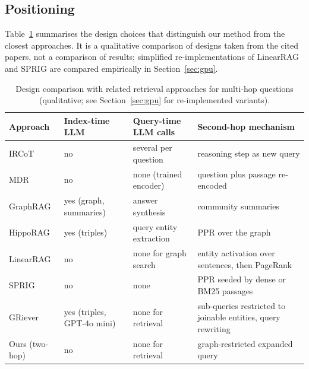 \documentclass[a4paper,fleqn]{cas-sc}
\begin{document}
\subsection{Positioning}
Table~\ref{tab:position} summarises the design choices that distinguish our method from the closest approaches. It is a qualitative comparison of designs taken from the cited papers, not a comparison of results; simplified re-implementations of LinearRAG and SPRIG are compared empirically in Section~\ref{sec:gpu}.

\begin{table}[t]
\centering
\small
\caption{Design comparison with related retrieval approaches for multi-hop questions (qualitative; see Section~\ref{sec:gpu} for re-implemented variants).}
\label{tab:position}
\begin{tabular}{p{3.6cm}p{2.7cm}p{3.0cm}p{3.6cm}}
\toprule
Approach & Index-time LLM & Query-time LLM calls & Second-hop mechanism \\
\midrule
IRCoT \citep{trivedi2023ircot} & no & several per question & reasoning step as new query \\
MDR \citep{xiong2021mdr} & no & none (trained encoder) & question plus passage re-encoded \\
GraphRAG \citep{edge2024graphrag} & yes (graph, summaries) & answer synthesis & community summaries \\
HippoRAG \citep{gutierrez2024hipporag} & yes (triples) & query entity extraction & PPR over the graph \\
LinearRAG \citep{zhuang2025linearrag} & no & none for graph search & entity activation over sentences, then PageRank \\
SPRIG \citep{wang2026sprig} & no & none & PPR seeded by dense or BM25 passages \\
GRiever \citep{melo2025griever} & yes (triples, GPT-4o mini) & none for retrieval & sub-queries restricted to joinable entities, query rewriting \\
Ours (two-hop) & no & none for retrieval & graph-restricted expanded query \\
\bottomrule
\end{tabular}
\end{table}
\end{document}
